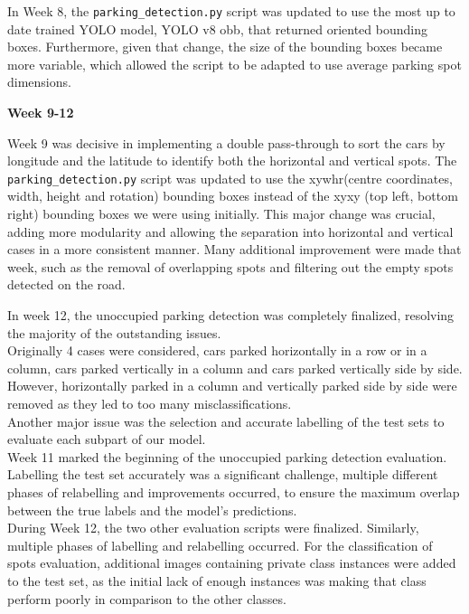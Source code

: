 In Week 8, the \texttt{parking\_detection.py} script was updated to use the most
up to date trained YOLO model, YOLO v8 obb, that returned oriented bounding
boxes. Furthermore, given that change, the size of
the bounding boxes became more variable, which allowed the script to be adapted
to use average parking spot dimensions.

\textbf{Week 9-12}

Week 9 was decisive in implementing a double pass-through to sort the cars by
longitude and the latitude to identify both the horizontal and vertical spots.
The \texttt{parking\_detection.py} script was updated to use the
xywhr(centre coordinates, width, height and rotation) bounding boxes instead of
the xyxy (top left, bottom right)  bounding boxes we were using initially. This
major change was crucial, adding more modularity and allowing the
separation into horizontal and vertical cases in a more consistent manner.
Many additional improvement were made that week, such as the removal of
overlapping spots and filtering out the empty spots detected on the road.

In week 12, the unoccupied parking detection was completely finalized, resolving the
majority of the outstanding issues.\\
Originally 4 cases were considered, cars parked horizontally in a row or in a
column, cars parked vertically in a column and cars parked vertically side by
side. However, horizontally parked in a column and vertically parked side by side
were removed as they led to too many misclassifications.\\

Another major issue was the selection and accurate labelling of the test sets to
evaluate each subpart of our model.\\
Week 11 marked the beginning of the unoccupied parking detection evaluation. 
Labelling the test set accurately was a significant challenge, multiple different 
phases of relabelling and improvements occurred, to ensure the maximum overlap 
between the true labels and the model's predictions.\\
During Week 12, the two other evaluation scripts were finalized. 
Similarly, multiple phases of labelling and relabelling occurred. For
the classification of spots evaluation, additional images containing private class instances
were added to the test set, as the initial lack of enough instances was making
that class perform poorly in comparison to the other classes.

\newpage{}